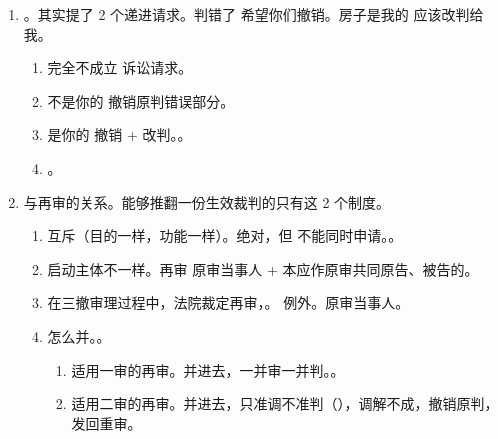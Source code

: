 \begin{enumerate}
\begin{enumerate}
        \end{enumerate}
  \item {}。其实提了 2 个递进请求。\yi 判错了 \yjt 希望你们撤销。\er 房子是我的 \yjt 应该改判给我。
        \begin{enumerate}
          \item 完全不成立 \yjt {}诉讼请求。
          \item 不是你的 \yjt 撤销原判错误部分。
          \item 是你的 \yjt 撤销 + 改判。。
          \item {}。
        \end{enumerate}
  \item 与再审的关系。能够推翻一份生效裁判的只有这 2 个制度。
        \begin{enumerate}
          \item 互斥（目的一样，功能一样）。绝对，但 \bdy 不能同时申请。。
          \item 启动主体不一样。再审 \yjt 原审当事人 + 本应作原审共同原告、被告的。
          \item 在三撤审理过程中，法院裁定再审，。
                例外。原审当事人。
          \item 怎么并。。
                \begin{enumerate}
                  \item 适用一审的再审。并进去，一并审一并判。。
                  \item 适用二审的再审。并进去，只准调不准判（），调解不成，撤销原判，发回重审。
                \end{enumerate}
        \end{enumerate}
\end{enumerate}

